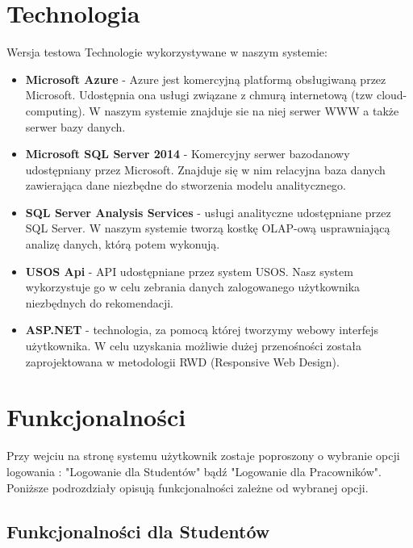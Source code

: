 \documentclass[licencjacka]{pracamgr}
\begin{document}
 \chapter{Technologia}
Wersja testowa \newline
Technologie wykorzystywane w naszym systemie:
\begin{itemize}

\item \textbf{Microsoft Azure} - Azure jest komercyjną platformą obsługiwaną przez Microsoft. Udostępnia ona usługi związane z chmurą internetową (tzw cloud-computing). W naszym systemie znajduje sie na niej serwer WWW a także serwer bazy danych. 

\item \textbf{Microsoft SQL Server 2014} - Komercyjny serwer bazodanowy udostępniany przez Microsoft. Znajduje się w nim relacyjna baza danych zawierająca dane niezbędne do stworzenia modelu analitycznego. 

\item \textbf{SQL Server Analysis Services} - usługi analityczne udostępniane przez SQL Server. W naszym systemie tworzą kostkę OLAP-ową usprawniającą analizę danych, którą potem wykonują.

\item \textbf {USOS Api} - API udostępniane przez system USOS. Nasz system wykorzystuje go w celu zebrania danych zalogowanego użytkownika niezbędnych do rekomendacji.

\item \textbf{ASP.NET} - technologia, za pomocą której tworzymy webowy interfejs użytkownika. W celu uzyskania możliwie dużej przenośności została zaprojektowana w metodologii RWD (Responsive Web Design).  

\end{itemize}

\chapter{Funkcjonalności}

Przy wejciu na stronę systemu użytkownik zostaje poproszony o wybranie opcji logowania : "Logowanie dla Studentów" bądź "Logowanie dla Pracowników". Poniższe podrozdziały opisują funkcjonalności zależne od wybranej opcji.

\section{Funkcjonalności dla Studentów}
\end{document}
